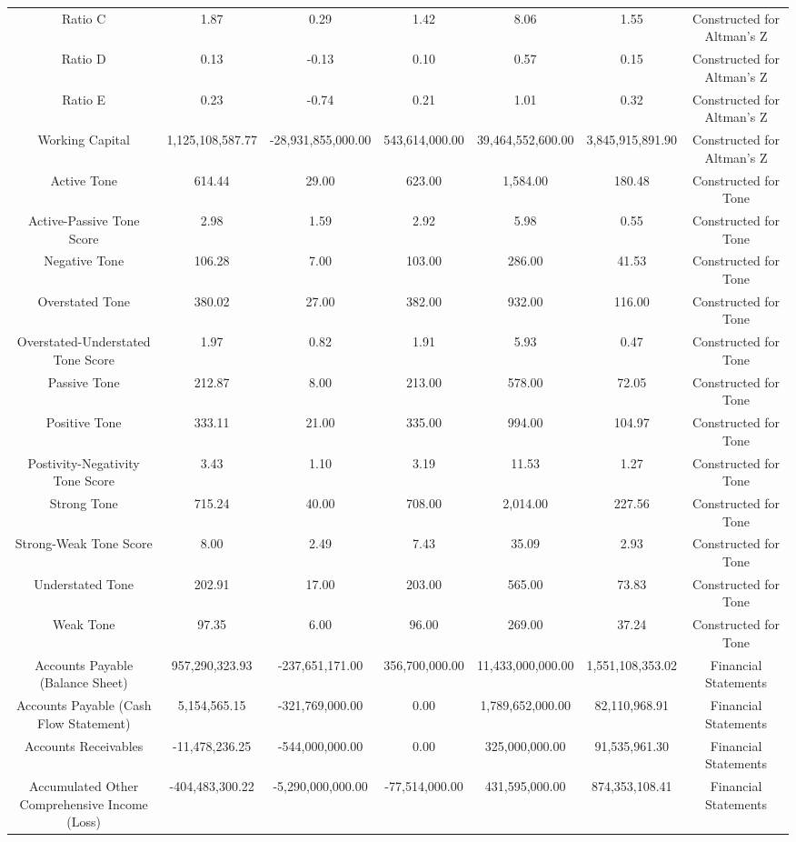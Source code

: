 \begin{longtable}{ccccccc}
Ratio C & 1.87 & 0.29 & 1.42 & 8.06 & 1.55 & Constructed for Altman's Z \\
Ratio D & 0.13 & -0.13 & 0.10 & 0.57 & 0.15 & Constructed for Altman's Z \\
Ratio E & 0.23 & -0.74 & 0.21 & 1.01 & 0.32 & Constructed for Altman's Z \\
Working Capital & 1,125,108,587.77 & -28,931,855,000.00 & 543,614,000.00 & 39,464,552,600.00 & 3,845,915,891.90 & Constructed for Altman's Z \\
Active Tone & 614.44 & 29.00 & 623.00 & 1,584.00 & 180.48 & Constructed for Tone \\
Active-Passive Tone Score & 2.98 & 1.59 & 2.92 & 5.98 & 0.55 & Constructed for Tone \\
Negative Tone & 106.28 & 7.00 & 103.00 & 286.00 & 41.53 & Constructed for Tone \\
Overstated Tone & 380.02 & 27.00 & 382.00 & 932.00 & 116.00 & Constructed for Tone \\
Overstated-Understated Tone Score & 1.97 & 0.82 & 1.91 & 5.93 & 0.47 & Constructed for Tone \\
Passive Tone & 212.87 & 8.00 & 213.00 & 578.00 & 72.05 & Constructed for Tone \\
Positive Tone & 333.11 & 21.00 & 335.00 & 994.00 & 104.97 & Constructed for Tone \\
Postivity-Negativity Tone Score & 3.43 & 1.10 & 3.19 & 11.53 & 1.27 & Constructed for Tone \\
Strong Tone & 715.24 & 40.00 & 708.00 & 2,014.00 & 227.56 & Constructed for Tone \\
Strong-Weak Tone Score & 8.00 & 2.49 & 7.43 & 35.09 & 2.93 & Constructed for Tone \\
Understated Tone & 202.91 & 17.00 & 203.00 & 565.00 & 73.83 & Constructed for Tone \\
Weak Tone & 97.35 & 6.00 & 96.00 & 269.00 & 37.24 & Constructed for Tone \\
Accounts Payable (Balance Sheet) & 957,290,323.93 & -237,651,171.00 & 356,700,000.00 & 11,433,000,000.00 & 1,551,108,353.02 & Financial Statements \\
Accounts Payable (Cash Flow Statement) & 5,154,565.15 & -321,769,000.00 & 0.00 & 1,789,652,000.00 & 82,110,968.91 & Financial Statements \\
Accounts Receivables & -11,478,236.25 & -544,000,000.00 & 0.00 & 325,000,000.00 & 91,535,961.30 & Financial Statements \\
Accumulated Other Comprehensive Income (Loss) & -404,483,300.22 & -5,290,000,000.00 & -77,514,000.00 & 431,595,000.00 & 874,353,108.41 & Financial Statements \\

\end{longtable}
